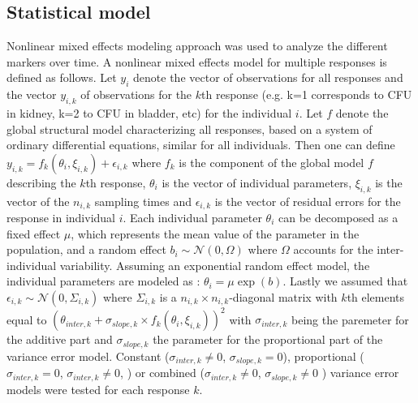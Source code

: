 \documentclass{article}
\begin{document}
\subsection{Statistical model}

Nonlinear mixed effects modeling approach was used to analyze the different markers over time. A nonlinear mixed effects model for multiple responses is defined as follows. Let $y_i$ denote the vector of observations for all responses and  the vector $y_{i,k}$ of observations for the $k$th response (e.g. k=1 corresponds to CFU in kidney, k=2 to CFU in bladder, etc) for the individual $i$. Let $f$ denote the global structural model characterizing all responses, based on a system of ordinary differential equations, similar for all individuals.
Then one can define $ y_{i,k} = f_{k}(\theta_i, \xi_{i,k} ) + \epsilon_{i,k} $ where $f_{k}$ is the component of the global model $f$ describing the $k$th response, $\theta_i$ is the vector of individual parameters, $\xi_{i,k}$ is the vector of the $n_{i,k}$ sampling times and $\epsilon_{i,k}$ is the vector of residual errors for the  response in individual $i$. Each individual parameter $\theta_i$ can be decomposed as a fixed effect $\mu$, which represents the mean value of the parameter in the population, and a random effect $b_i \sim \mathcal{N}(0, \Omega)$ where $\Omega$ accounts for the inter-individual variability. Assuming an exponential random effect model, the individual parameters are modeled as : $\theta_i = \mu \exp(b)$.
Lastly we assumed that $\epsilon_{i,k} \sim \mathcal{N} (0, \Sigma_{i,k})$ where $\Sigma_{i,k}$ is a $ n_{i,k} \times n_{i,k}$-diagonal matrix with $k$th elements equal to $(\theta_{inter,k} + \sigma_{slope,k}\times f_{k}(\theta_i, \xi_{i,k}))^2$ with $\sigma_{inter, k}$ being the paremeter for the additive part and $\sigma_{slope,k}$ the parameter for the proportional part of the variance error model. Constant ($\sigma_{inter, k} \neq 0$, $\sigma_{slope, k} = 0$), proportional ($\sigma_{inter, k} = 0$, $\sigma_{inter, k} \neq 0$, ) or combined ($\sigma_{inter, k} \neq 0$, $\sigma_{slope, k} \neq 0$ ) variance error models were tested for each response $k$.
\end{document}
